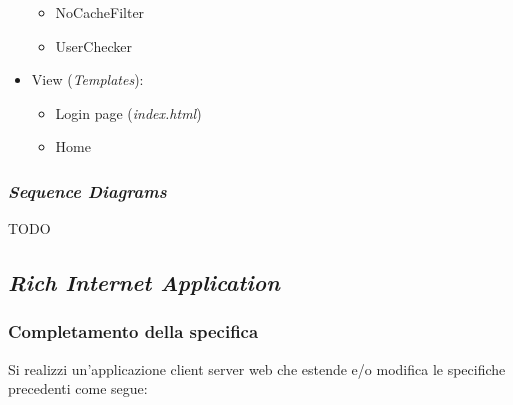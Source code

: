 \begin{itemize}
  \begin{itemize}
  \tightlist
  \item
    NoCacheFilter
  \item
    UserChecker
  \end{itemize}
\item
  View (\emph{Templates}):

  \begin{itemize}
  \tightlist
  \item
    Login page (\emph{index.html})
  \item
    Home
  \end{itemize}
\end{itemize}

\hypertarget{sequence-diagrams}{%
\subsubsection{\texorpdfstring{\emph{Sequence
Diagrams}}{Sequence Diagrams}}\label{sequence-diagrams}}

TODO

\hypertarget{rich-internet-application}{%
\subsection{\texorpdfstring{\emph{Rich Internet
Application}}{Rich Internet Application}}\label{rich-internet-application}}

\hypertarget{completamento-della-specifica}{%
\subsubsection{Completamento della
specifica}\label{completamento-della-specifica}}

Si realizzi un'applicazione client server web che estende e/o modifica
le specifiche precedenti come segue:

